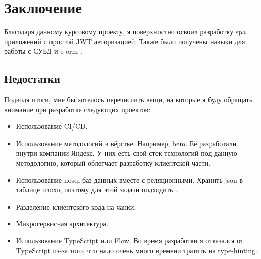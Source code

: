 \section{Заключение}
Благодаря данному курсовому проекту, я поверхностно освоил разработку \acrshort{spa} приложений с простой JWT авторизацией. Также были получены навыки для работы с СУБД \textcite{postgres} и c \acrshort{orm} \textcite{seqorm}.

\subsection{Недостатки}
Подводя итоги, мне бы хотелось перечислить вещи, на которые я буду обращать внимание при разработке следующих проектов:
\begin{itemize}
    \item Использование CI/CD.
    \item Использование методологий в вёрстке. Например, \acrfull{bem}. Её разработали внутри компании Яндекс. У них есть свой стек технологий под данную методологию, который облегчает разработку клиентской части.
    \item Использование \acrshort{nosql} баз данных вместе с реляционными. Хранить \acrshort{json} в таблице плохо, поэтому для этой задачи подходить \textcite{mongodb}.
    \item Разделение клиентского кода на чанки.
    \item Микросервисная архитектура.
    \item Использование TypeScript или Flow. Во время разработки я отказался от TypeScript из-за того, что надо очень много времени тратить на type-hinting.
\end{itemize}

\clearpage